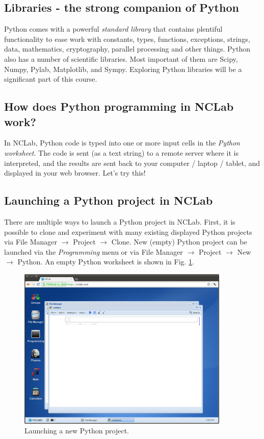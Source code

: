 \documentclass[article,A4,12pt]{llncs}
\begin{document}
\subsection{Libraries - the strong companion of Python}

Python comes with a powerful {\em standard library} that contains plentiful functionality
to ease work with constants, types, functions, exceptions, strings, data, 
mathematics, cryptography, parallel processing and other things. 
Python also has a number of scientific libraries. Most important of them are Scipy, 
Numpy, Pylab, Matplotlib, and Sympy. Exploring Python libraries will be a significant 
part of this course. 

\subsection{How does Python programming in NCLab work?}

In NCLab, Python code is typed into one or more input cells in the {\em Python worksheet}. 
The code is sent (as a text string) to a remote server where it is interpreted, and the 
results are sent back to your computer / laptop / tablet, and displayed in your web 
browser.  Let's try this!

\subsection{Launching a Python project in NCLab}

There are multiple ways to launch a Python project in NCLab. First, it is 
possible to clone and experiment with many existing displayed Python 
projects via File Manager $\rightarrow$ 
Project $\rightarrow$ Clone. New (empty) Python project can be launched via 
the {\em Programming} menu or via File Manager $\rightarrow$ 
Project $\rightarrow$ New $\rightarrow$ Python. An empty Python worksheet
is shown in Fig. \ref{fig:python}.

\newpage
\begin{figure}[!ht]
\begin{center}
\includegraphics[width=0.9\textwidth]{img/python.png}
\end{center}
\vspace{-2mm}
\caption{Launching a new Python project.}
\label{fig:python}
\end{figure}
\end{document}
